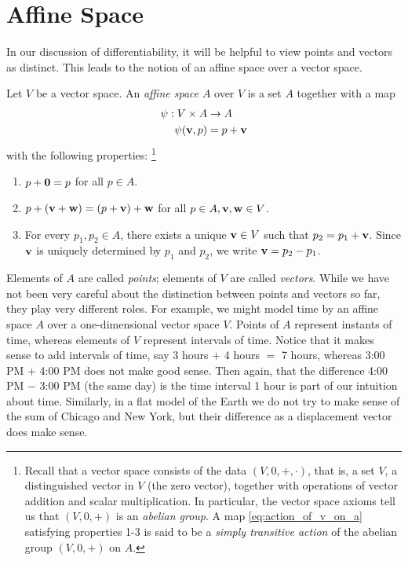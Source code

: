 \documentclass[12pt,letterpaper,reqno]{article}
\numberwithin{equation}{section}
\newcommand{\zv}{{\bf 0}}
\newcommand{\bv}{{\bf v}}
\newcommand{\bw}{{\bf w}}
\begin{document}
{\section{Affine Space}\label{app:affine_space}
In our discussion of differentiability, it will be helpful to view points and vectors as distinct. This leads to the notion of an affine space over a vector space.
\begin{defn}\label{def:affine_space}
	Let $V$ be a vector space. An \emph{affine space} $A$ over $V$ is a set $A$ together with a map
	\begin{align}\label{eq:action_of_v_on_a}
		\psi:V \times A &\to A \\
		\psi(\bv,p)&=p+\bv
	\end{align}
	with the following properties: \footnote{Recall that a vector space consists of the data $(V,0,+,\cdot)$, that is, a set $V$, a distinguished vector in $V$ (the zero vector), together with operations of vector addition and scalar multiplication. In particular, the vector space axioms tell us that $(V,0,+)$ is an \emph{abelian group}. A map \eqref{eq:action_of_v_on_a} satisfying properties 1-3 is said to be a \emph{simply transitive action} of the abelian group $(V,0,+)$ on $A$.}
	\begin{enumerate}
		\item $p+\zv=p$ for all $p \in A$.
		\item $p+(\bv+\bw)=(p+\bv)+\bw$ for all $p \in A, \bv,\bw \in V$.
		\item For every $p_1,p_2 \in A$, there exists a unique $\bv \in V$ such that $p_2=p_1+\bv$. Since $\bv$ is uniquely determined by $p_1$ and $p_2$, we write $\bv=p_2-p_1$. 
	\end{enumerate}
\end{defn}
Elements of $A$ are called \emph{points}; elements of $V$ are called \emph{vectors}. While we have not been very careful about the distinction between points and vectors so far, they play very different roles. For example, we might model time by an affine space $A$ over a one-dimensional vector space $V$. Points of $A$ represent instants of time, whereas elements of $V$ represent intervals of time. Notice that it makes sense to add intervals of time, say 3 hours $+$ 4 hours $=$ 7 hours, whereas 3:00 PM $+$ 4:00 PM does not make good sense. Then again, that the difference 4:00 PM $-$ 3:00 PM (the same day) is the time interval 1 hour is part of our intuition about time. Similarly, in a flat model of the Earth we do not try to make sense of the sum of Chicago and New York, but their difference as a displacement vector does make sense.

}
\end{document}
